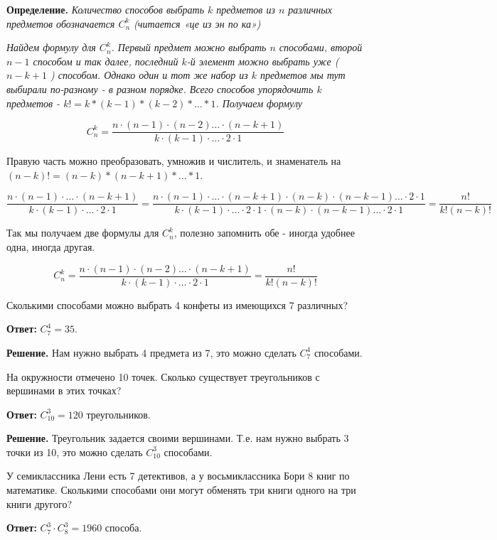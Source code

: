 

\textbf{Определение.} 
\textit{Количество способов выбрать $k$ предметов из $n$ различных предметов обозначается $C_n^k$ (читается «це из эн по ка»)}

\textit{Найдем формулу для $C_n^k$. Первый предмет можно выбрать $n$ способами, второй $n-1$ способом и так далее, последний $k$-й элемент можно выбрать уже ( $n-k+1$ ) способом. Однако один и тот же набор из $k$ предметов мы тут выбирали по-разному - в разном порядке. Всего способов упорядочить $k$ предметов - $k!=k *(k-1) *(k-2) * \ldots * 1$. Получаем формулу}

$$
C_n^k=\frac{n \cdot(n-1) \cdot(n-2) \ldots \cdot(n-k+1)}{k \cdot(k-1) \cdot \ldots \cdot 2 \cdot 1}
$$


Правую часть можно преобразовать, умножив и числитель, и знаменатель на $(n-k)!=(n-k) *(n-k+1) * \ldots * 1$.

$$
\frac{n \cdot(n-1) \cdot \ldots \cdot(n-k+1)}{k \cdot(k-1) \cdot \ldots \cdot 2 \cdot 1}=\frac{n \cdot(n-1) \cdot \ldots \cdot(n-k+1) \cdot(n-k) \cdot(n-k-1) \ldots \cdot 2 \cdot 1}{k \cdot(k-1) \cdot \ldots \cdot 2 \cdot 1 \cdot(n-k) \cdot(n-k-1) \ldots \cdot 2 \cdot 1}=\frac{n!}{k!(n-k)!}
$$


Так мы получаем две формулы для $C_n^k$, полезно запомнить обе - иногда удобнее одна, иногда другая.

$$
C_n^k=\frac{n \cdot(n-1) \cdot(n-2) \ldots \cdot(n-k+1)}{k \cdot(k-1) \cdot \ldots \cdot 2 \cdot 1}=\frac{n!}{k!(n-k)!}
$$


Сколькими способами можно выбрать 4 конфеты из имеющихся 7 различных?

\textbf{Ответ:} $C_7^4=35$.

\textbf{Решение.} Нам нужно выбрать 4 предмета из 7, это можно сделать $C_7^4$ способами.

На окружности отмечено 10 точек. Сколько существует треугольников с вершинами в этих точках?

\textbf{Ответ:} $C_{10}^3=120$ треугольников.

\textbf{Решение.} Треугольник задается своими вершинами. Т.е. нам нужно выбрать 3 точки из 10, это можно сделать $C_{10}^3$ способами.

У семиклассника Лени есть 7 детективов, а у восьмиклассника Бори 8 книг по математике. Сколькими способами они могут обменять три книги одного на три книги другого?

\textbf{Ответ:} $C_7^3 \cdot C_8^3=1960$ способа.

